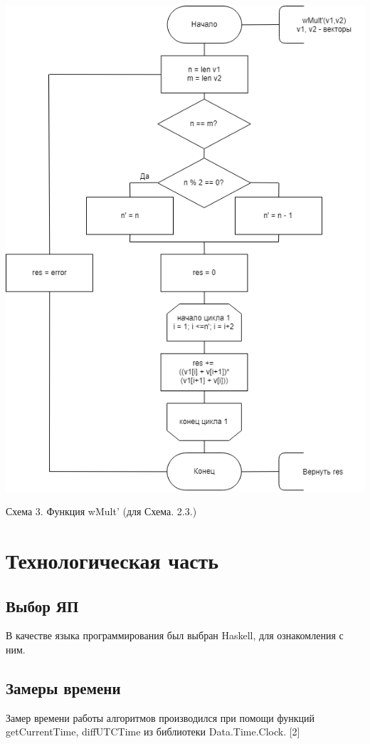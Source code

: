 \documentclass[12pt]{report}
\begin{document}
\begin{center}
    \includegraphics[scale=0.7]{wMult}

    Схема 3. Функция wMult' (для Схема. 2.3.)
\end{center}

\chapter{Технологическая часть}
\section{Выбор ЯП}
В качестве языка программирования был выбран Haskell, для ознакомления с ним.

\section{Замеры времени}
Замер времени работы алгоритмов производился при помощи функций getCurrentTime, diffUTCTime из библиотеки Data.Time.Clock. [2]
\end{document}
